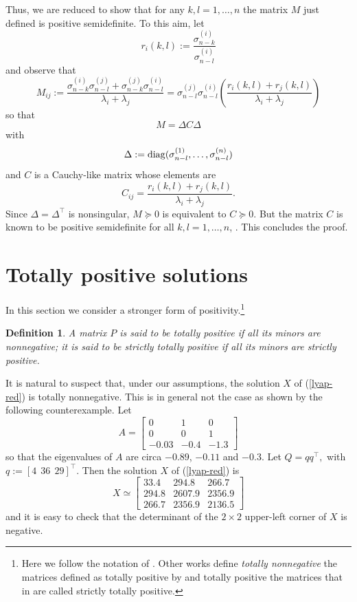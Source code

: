 \documentclass[12pt]{article}
\newcommand{\tp}{^{\top}}
\newcommand{\beq}{\begin{equation}}
\newcommand{\eeq}{\end{equation}}
\def\bmat{\left[ \begin{array}}
\def\emat{\end{array} \right]}
\newtheorem{definition}{Definition}[section]
\begin{document}
Thus, we are reduced to show that for any $k,l=1,\dots,n$ the matrix $M$ just defined is positive semidefinite.
To this aim, 
let $$r_i(k,l):= \frac{\sigma_{n-k}^{(i)}}{\sigma_{n-l}^{(i)}}$$
and observe that
$$M_{ij}:=\frac{\sigma_{n-k}^{(i)}\sigma_{n-l}^{(j)}+\sigma_{n-k}^{(j)}\sigma_{n-l}^{(i)}}{\lambda_i +\lambda_j}=\sigma_{n-l}^{(j)}\sigma_{n-l}^{(i)} \left( \frac{r_i(k,l) + r_j(k,l)}{\lambda_i + \lambda_j} \right) $$
so that
$$M=\Delta C\Delta$$
with $$\Delta:={\rm diag}(\sigma_{n-l}^{(1)}, \dots, \sigma_{n-l}^{(n)})$$
and
$C$ is a Cauchy-like matrix whose elements are
\beq\label{Cauchy-likemat}
C_{ij}=\frac{r_i(k,l) + r_j(k,l)}{\lambda_i + \lambda_j}.
\eeq
Since $\Delta=\Delta\tp$ is nonsingular, $M\succeq 0$ is equivalent to $C \succeq 0$.
But the matrix $C$ is known to be positive semidefinite for all $k,l=1,\dots,n$, \cite{ferrante2026positivityclasscauchylikematrices}.
This concludes the proof. 








\section{Totally positive solutions}

In this section we consider a stronger form of positivity.\footnote{Here we follow the notation of \cite{Pinkus-TPM}. Other works define {\em totally
nonnegative} the matrices defined as totally positive by \cite{Pinkus-TPM}
and totally positive the matrices that in \cite{Pinkus-TPM} are called 
strictly
totally positive.}

\begin{definition}
A matrix $P$ is said to be {\em totally positive} if
all its minors are nonnegative; it is said to be {\em strictly
totally positive} if all its minors are strictly positive.
\end{definition}

It is natural to suspect that, under our assumptions, the solution $X$
of (\ref{lyap-red}) is totally nonnegative.
This is in general not the case  as
shown by the following counterexample.
Let  
$$
A=\bmat{ccc}0&    1& 0\\
         0   &       0   &  1\\
   -0.03  &-0.4   & -1.3\emat
   $$
so that the eigenvalues of $A$ are circa $-0.89$,
$-0.11$ and
$-0.3$.
Let $Q=qq\tp,$ with 
$q:=[4\ \ 36\ \ 29]\tp$.
Then the solution $X$ of (\ref{lyap-red}) is
$$
X\simeq\bmat{ccc}
33.4  &  294.8  &  266.7\\
294.8  &  2607.9  &  2356.9\\
266.7  &  2356.9  &  2136.5\emat
$$
and it is easy to check that the determinant of the $2\times 2$ upper-left corner of $X$ is negative.
\end{document}
